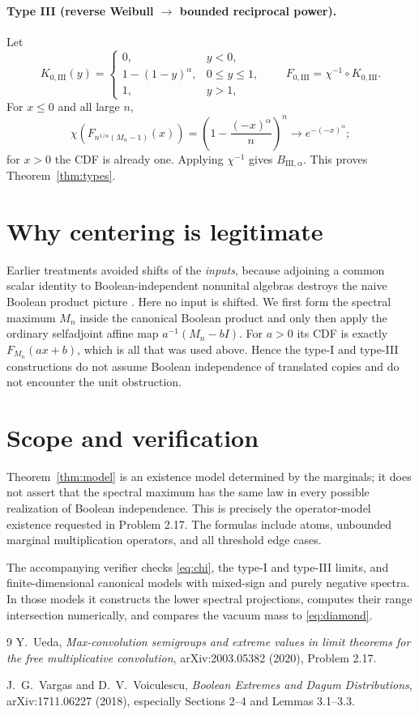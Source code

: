 \documentclass[11pt]{article}
\begin{document}
\paragraph{Type III (reverse Weibull $\longrightarrow$ bounded reciprocal power).}
Let
\[
K_{0,\mathrm{III}}(y)=
\begin{cases}
0,&y<0,\\
1-(1-y)^\alpha,&0\leq y\leq1,\\
1,&y>1,
\end{cases}
\qquad F_{0,\mathrm{III}}=\chi^{-1}\circ K_{0,\mathrm{III}}.
\]
For $x\leq0$ and all large $n$,
\[
\chi\!\left(F_{n^{1/\alpha}(M_n-1)}(x)\right)
=\left(1-\frac{(-x)^\alpha}{n}\right)^n
\longrightarrow e^{-(-x)^\alpha};
\]
for $x>0$ the CDF is already one.  Applying $\chi^{-1}$ gives
$B_{\mathrm{III},\alpha}$.  This proves Theorem~\ref{thm:types}.

\section{Why centering is legitimate}

Earlier treatments avoided shifts of the \emph{inputs}, because adjoining a
common scalar identity to Boolean-independent nonunital algebras destroys the
naive Boolean product picture \cite[Section 2]{VV2018}.  Here no input is
shifted.  We first form the spectral maximum $M_n$ inside the canonical
Boolean product and only then apply the ordinary selfadjoint affine map
$a^{-1}(M_n-bI)$.  For $a>0$ its CDF is exactly
$F_{M_n}(ax+b)$, which is all that was used above.  Hence the type-I and
type-III constructions do not assume Boolean independence of translated
copies and do not encounter the unit obstruction.

\section{Scope and verification}

Theorem~\ref{thm:model} is an existence model determined by the marginals; it
does not assert that the spectral maximum has the same law in every possible
realization of Boolean independence.  This is precisely the operator-model
existence requested in Problem 2.17.  The formulas include atoms, unbounded
marginal multiplication operators, and all threshold edge cases.

The accompanying verifier checks \eqref{eq:chi}, the type-I and type-III
limits, and finite-dimensional canonical models with mixed-sign and purely
negative spectra.  In those models it constructs the lower spectral
projections, computes their range intersection numerically, and compares the
vacuum mass to \eqref{eq:diamond}.

\begin{thebibliography}{9}
Y.~Ueda,
\emph{Max-convolution semigroups and extreme values in limit theorems for the
free multiplicative convolution}, arXiv:2003.05382 (2020), Problem 2.17.

J.~G.~Vargas and D.~V.~Voiculescu,
\emph{Boolean Extremes and Dagum Distributions}, arXiv:1711.06227 (2018),
especially Sections 2--4 and Lemmas 3.1--3.3.
\end{thebibliography}
\end{document}
